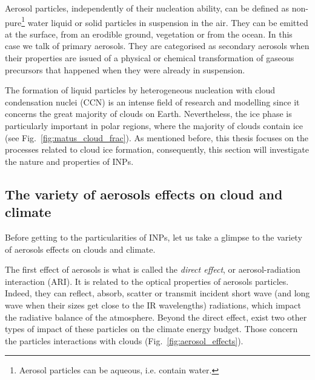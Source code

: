     Aerosol particles, independently of their nucleation ability, can be defined as non-pure\footnote{Aerosol particles can be aqueous, i.e. contain water.} water liquid or solid particles in suspension in the air.
    They can be emitted at the surface, from an erodible ground, vegetation or from the ocean. In this case we talk of primary aerosols. They are categorised as secondary aerosols when their properties are issued of a physical or chemical transformation of gaseous precursors that happened when they were already in suspension.

    The formation of liquid particles by heterogeneous nucleation with cloud condensation nuclei (CCN) is an intense field of research and modelling since it concerns the great majority of clouds on Earth. Nevertheless, the ice phase is particularly important in polar regions, where the majority of clouds contain ice (see Fig.~\ref{fig:matus_cloud_frac}). As mentioned before, this thesis focuses on the processes related to cloud ice formation, consequently, this section will investigate the nature and properties of INPs.

%
    \subsection{The variety of aerosols effects on cloud and climate}
    \label{sec:aerosol_effects}
    Before getting to the particularities of INPs, let us take a glimpse to the variety of aerosols effects on clouds and climate. 

     The first effect of aerosols is what is called the \textit{direct effect}, or aerosol-radiation interaction (ARI). It is related to the optical properties of aerosols particles. Indeed, they can reflect, absorb, scatter or transmit incident short wave (and long wave when their sizes get close to the IR wavelengths) radiations, which impact the radiative balance of the atmosphere. 
     Beyond the direct effect, exist two other types of impact of these particles on the climate energy budget. Those concern the particles interactions with clouds (Fig.~\ref{fig:aerosol_effects}).

